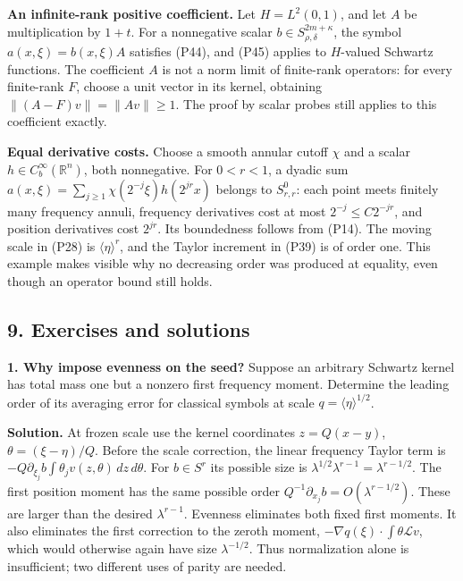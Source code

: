 \documentclass[
  11pt,
]{article}
\begin{document}
\textbf{An infinite-rank positive coefficient.} Let \(H=L^2(0,1)\), and
let \(A\) be multiplication by \(1+t\). For a nonnegative scalar
\(b\in S^{2m+\kappa}_{\rho,\delta}\), the symbol \(a(x,\xi)=b(x,\xi)A\)
satisfies (P44), and (P45) applies to \(H\)-valued Schwartz functions.
The coefficient \(A\) is not a norm limit of finite-rank operators: for
every finite-rank \(F\), choose a unit vector in its kernel, obtaining
\(\|(A-F)v\|=\|Av\|\geq1\). The proof by scalar probes still applies to
this coefficient exactly.

\textbf{Equal derivative costs.} Choose a smooth annular cutoff \(\chi\)
and a scalar \(h\in C_b^\infty(\mathbb R^n)\), both nonnegative. For
\(0<r<1\), a dyadic sum
\(a(x,\xi)=\sum_{j\geq1}\chi(2^{-j}\xi)h(2^{jr}x)\) belongs to
\(S^0_{r,r}\): each point meets finitely many frequency annuli,
frequency derivatives cost at most \(2^{-j}\leq C2^{-jr}\), and position
derivatives cost \(2^{jr}\). Its boundedness follows from (P14). The
moving scale in (P28) is \(\langle\eta\rangle^r\), and the Taylor
increment in (P39) is of order one. This example makes visible why no
decreasing order was produced at equality, even though an operator bound
still holds.

\subsection{9. Exercises and solutions}\label{exercises-and-solutions}

\textbf{1. Why impose evenness on the seed?} Suppose an arbitrary
Schwartz kernel has total mass one but a nonzero first frequency moment.
Determine the leading order of its averaging error for classical symbols
at scale \(q=\langle\eta\rangle^{1/2}\).

\textbf{Solution.} At frozen scale use the kernel coordinates
\(z=Q(x-y)\), \(\theta=(\xi-\eta)/Q\). Before the scale correction, the
linear frequency Taylor term is
\(-Q\partial_{\xi_j}b\int\theta_jv(z,\theta)\,dz\,d\theta\). For
\(b\in S^r\) its possible size is
\(\lambda^{1/2}\lambda^{r-1}=\lambda^{r-1/2}\). The first position
moment has the same possible order
\(Q^{-1}\partial_{x_j}b=O(\lambda^{r-1/2})\). These are larger than the
desired \(\lambda^{r-1}\). Evenness eliminates both fixed first moments.
It also eliminates the first correction to the zeroth moment,
\(-\nabla q(\xi)\cdot\int\theta\mathcal L v\), which would otherwise
again have size \(\lambda^{-1/2}\). Thus normalization alone is
insufficient; two different uses of parity are needed.
\end{document}
